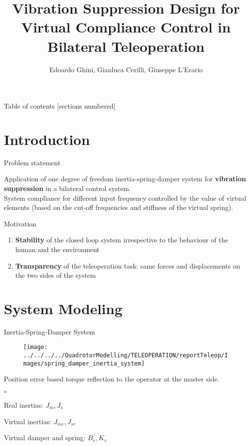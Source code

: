 \documentclass[10pt]{beamer}
\title{Vibration Suppression Design for Virtual Compliance Control in Bilateral Teleoperation}
\date{}
\author{Edoardo Ghini, Gianluca Cerilli, Giuseppe L'Erario}
\institute{La Sapienza University}
\begin{document}
	
	\maketitle
	
	\begin{frame}{Table of contents}
	[sections numbered]
	\tableofcontents[hideallsubsections]
\end{frame}

\section{Introduction}

\begin{frame}[fragile]{Problem statement}

Application of one degree of freedom inertia-spring-damper system for \textbf{vibration suppression} in a bilateral control system.\\
\bigskip
System compliance for different input frequency controlled by the
value of virtual elements (based on the cut-off frequencies and stiffness of the virtual spring).

\end{frame}
\begin{frame}[fragile]{Motivation}

\begin{enumerate}
\item \textbf{Stability} of the closed loop system irrespective to the behaviour of the human and the environment
\bigskip
\item \textbf{Transparency} of the teleoperation task: same forces and displacements on the two sides of the system \end{enumerate}

\end{frame}

\section{System Modeling}

\begin{frame}{Inertia-Spring-Damper System}
	
	\begin{figure}[h]
	\centering
	\texttt{[image: ../../../../QuadrotorModelling/TELEOPERATION/reportTeleop/Images/spring\_damper\_inertia\_system]}
	\end{figure}

Position error based torque reflection to the operator at the
master side.
	
	\begin{list}{$ \circ $}{}
		\item Real inertias: $ J_{m}, J_{s} $
		\item Virtual inertias: $ J_{mv}, J_{sv} $
		\item Virtual damper and spring: $ B_{v}, K_{v} $
	\end{list}

\end{frame}
\end{document}
